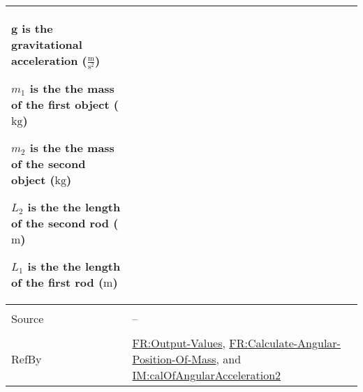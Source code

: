 \documentclass[12pt]{article}
\begin{document}
\begin{minipage}{\textwidth}
\begin{tabular}{>{\raggedright}p{}>{\raggedright\arraybackslash}p{}}
\begin{symbDescription}
              \item{$\symbf{g}$ is the gravitational acceleration ($\frac{\text{m}}{\text{s}^{2}}$)}
              \item{${m_{1}}$ is the the mass of the first object (${\text{kg}}$)}
              \item{${m_{2}}$ is the the mass of the second object (${\text{kg}}$)}
              \item{${L_{2}}$ is the the length of the second rod (${\text{m}}$)}
              \item{${L_{1}}$ is the the length of the first rod (${\text{m}}$)}
              \end{symbDescription}
\\ \midrule \\
Source & --
         
\\ \midrule \\
RefBy & \hyperref[outputValues]{FR:Output-Values}, \hyperref[calcAngPos]{FR:Calculate-Angular-Position-Of-Mass}, and \hyperref[IM:calOfAngularAcceleration2]{IM:calOfAngularAcceleration2}
        
\\ \bottomrule
\end{tabular}
\end{minipage}
\end{document}
